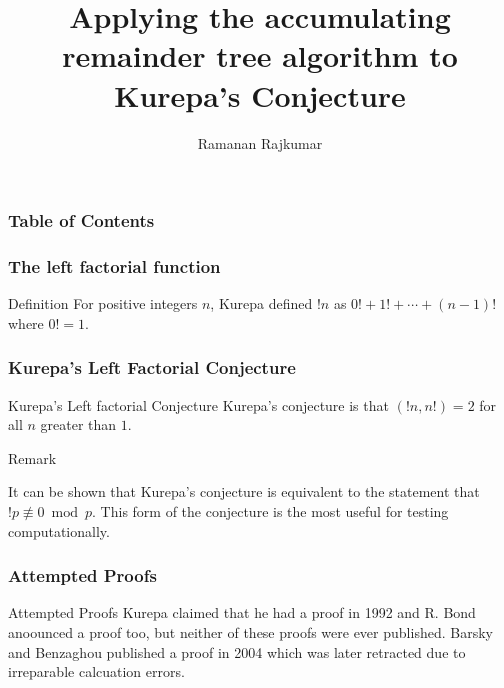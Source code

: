 \documentclass{beamer}
\title{Applying the accumulating remainder tree algorithm to Kurepa's Conjecture}
\author{Ramanan Rajkumar}
\institute{UNSW Sydney}
\date
\begin{document}
 
\frame{\titlepage}

\begin{frame}
\frametitle{Table of Contents}
\tableofcontents
\end{frame}



\begin{frame}
\frametitle{The left factorial function}

\begin{block}{Definition}
For positive integers $n$, Kurepa defined $!n$ as $0!+1!+\cdots +(n-1)!$ where $0!=1$. 
\end{block}

\end{frame}

\begin{frame}
\frametitle{Kurepa's Left Factorial Conjecture}

\begin{block}{Kurepa's Left factorial Conjecture}
Kurepa's conjecture is that $(!n, n!)=2$ for all $n$ greater than $1$.
\end{block}

\begin{block}{Remark}

It can be shown that Kurepa's conjecture is equivalent to the statement that
$!p\not \equiv 0 \bmod p$. This form of the conjecture is the most useful for testing computationally.

\end{block}

\end{frame}
 
\begin{frame}
\frametitle{Attempted Proofs}

\begin{block}{Attempted Proofs}
Kurepa claimed that he had a proof in 1992 and R. Bond anoounced a proof too, but neither of these
proofs were ever published. Barsky and Benzaghou published a proof in 2004 which was later retracted
due to irreparable calcuation errors. 
\end{block}
\end{frame}
\end{document}
